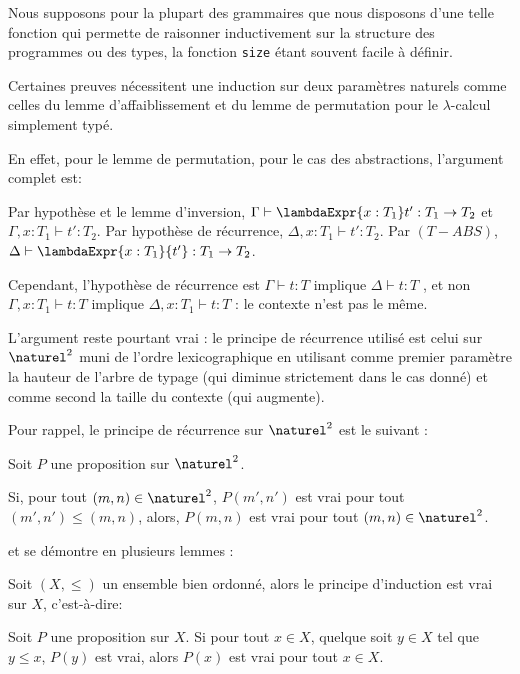 Nous supposons pour la plupart des grammaires que nous disposons d'une telle
fonction qui permette de raisonner inductivement sur la structure des
programmes ou des types, la fonction \verb|size| étant souvent facile à définir.

Certaines preuves nécessitent une induction sur deux paramètres naturels comme celles
du lemme d'affaiblissement et du lemme de permutation pour le $\lambda$-calcul
simplement typé.

En effet, pour le lemme de permutation, pour le cas des abstractions, l'argument
complet est:

\og Par hypothèse et le lemme d'inversion, $\Gamma \vdash \lambdaExpr{x : T_{1}}
t' : T_{1} \rightarrow T_{2}$ et $\Gamma, x : T_{1} \vdash t' : T_{2}$. Par
hypothèse de récurrence, $\Delta, x : T_{1} \vdash t' : T_{2}$. Par $(T-ABS)$,
$\Delta \vdash \lambdaExpr{x : T_{1}}{t'} : T_{1} \rightarrow T_{2}$. \fg

Cependant, l'hypothèse de récurrence est \og $\Gamma \vdash t : T$ implique $\Delta
\vdash t : T$ \fg, et non \og $\Gamma, x : T_{1} \vdash t : T$ implique $\Delta, x :
T_{1} \vdash t : T$ \fg : le contexte n'est pas le même.

L'argument reste pourtant vrai : le principe de récurrence utilisé est celui sur
$\naturel^{2}$ muni de l'ordre lexicographique en utilisant comme premier
paramètre la hauteur de l'arbre de typage (qui diminue strictement dans le cas donné) et
comme second la taille du contexte (qui augmente).

Pour rappel, le principe de récurrence sur $\naturel^{2}$ est le suivant :
\begin{proposition}
  Soit $P$ une proposition sur $\naturel^{2}$.

  Si, pour tout $(m, n) \in \naturel^{2}$, $P(m', n')$ est vrai pour tout $(m',
  n') \leq (m, n)$, alors, $P(m, n)$ est vrai pour tout $(m, n) \in \naturel^{2}$.
\end{proposition}

et se démontre en plusieurs lemmes :

\begin{lemma} 
  Soit $(X, \leq)$ un ensemble bien ordonné, alors le principe d'induction est
  vrai sur $X$, c'est-à-dire:

  Soit $P$ une proposition sur $X$.
  Si pour tout $x \in X$, quelque soit $y \in X$ tel que $y \leq x$, $P(y)$ est
  vrai, alors $P(x)$ est vrai pour tout $x \in X$.
\end{lemma}

